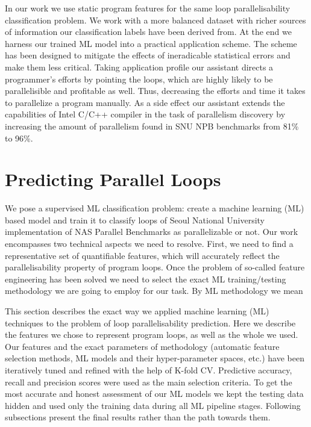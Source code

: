 \documentclass{acaces}
\begin{document}
\quad In our work we use static program features for the same loop parallelisability classification problem. We work with a more balanced dataset with richer sources of information our classification labels have been derived from. At the end we harness our trained ML model into a practical application scheme. The scheme has been designed to mitigate the effects of ineradicable statistical errors and make them less critical. Taking application profile our assistant directs a programmer's efforts by pointing the loops, which are highly likely to be parallelisible and profitable as well. Thus, decreasing the efforts and time it takes to parallelize a program manually. As a side effect our assistant extends the capabilities of Intel C/C++ compiler in the task of parallelism discovery by increasing the amount of parallelism found in SNU NPB benchmarks from 81\% to 96\%.

\section{Predicting Parallel Loops}
\label{predicting_parallel_loops}
\quad We pose a supervised ML classification problem: create a machine learning (ML) based model and train it to classify loops of Seoul National University implementation \cite{snu-npb-benchmarks} of NAS Parallel Benchmarks \cite{nasa-parallel-benchmarks} as parallelizable or not.\newline\null
\quad Our work encompasses two technical aspects we need to resolve. First, we need to find a representative set of quantifiable features, which will accurately reflect the parallelisability property of program loops. Once the problem of so-called feature engineering has been solved we need to select the exact ML training/testing methodology we are going to employ for our task. By ML methodology we mean      


\quad This section describes the exact way we applied machine learning (ML) techniques to the problem of loop parallelisability prediction. Here we describe the features we chose to represent program loops, as well as the whole  we used.\newline\null
\quad Our features and the exact parameters of methodology (automatic feature selection methods, ML models and their hyper-parameter spaces, etc.) have been iteratively tuned and refined with the help of K-fold CV. Predictive accuracy, recall and precision scores were used as the main selection criteria. To get the most accurate and honest assessment of our ML models we kept the testing data hidden and used only the training data during all ML pipeline stages. Following subsections present the final results rather than the path towards them.
\end{document}
